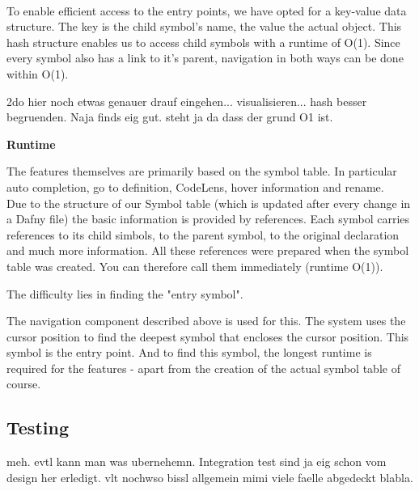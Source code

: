  \\

To enable efficient access to the entry points, we have opted for a key-value data structure. The key is the child symbol's name, the value the actual  object.
This hash structure enables us to access child symbols with a runtime of O(1). Since every symbol also has a link to it's parent, navigation in both ways can be done within O(1).

2do hier noch etwas genauer drauf eingehen... visualisieren... hash besser begruenden. Naja finds eig gut. steht ja da dass der grund O1 ist.

\textbf{Runtime}


The features themselves are primarily based on the symbol table.
In particular auto completion, go to definition, CodeLens, hover information and rename. \\

Due to the structure of our Symbol table (which is updated after every change in a Dafny file)
the basic information is provided by references.
Each symbol carries references to its child simbols, to the parent symbol, to the original declaration and much more information.
All these references were prepared when the symbol table was created. You can therefore call them immediately (runtime O(1)).  

The difficulty lies in finding the "entry symbol".

The navigation component described above is used for this. The system uses the cursor position to find the deepest symbol that encloses the cursor position. This symbol is the entry point. And to find this symbol, the longest runtime is required for the features - apart from the creation of the actual symbol table of course.




\subsection{Testing}
meh. evtl kann man was ubernehemn.  Integration test sind ja eig schon vom design her erledigt. vlt nochwso bissl allgemein mimi viele faelle abgedeckt blabla.

